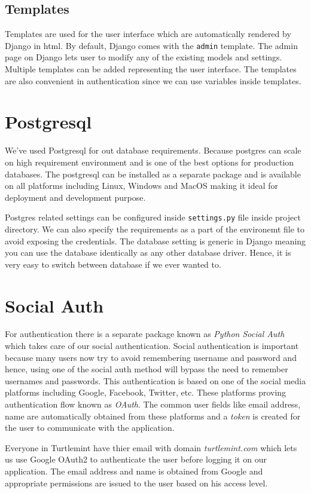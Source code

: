 \subsection{\textbf{Templates}}
Templates are used for the user interface which are automatically rendered by
Django in html. By default, Django comes with the \texttt{admin} template.
The admin page on Django lets user to modify any of the existing models and
settings. Multiple templates can be added representing the user interface.
The templates are also convenient in authentication since we can use variables
inside templates.

\section{Postgresql}
We've used Postgresql for out database requirements. Because postgres can
scale on high requirement environment and is one of the best options for
production databases. The postgresql can be installed as a separate package
and is available on all platforms including Linux, Windows and MacOS making
it ideal for deployment and development purpose.

Postgres related settings can be configured inside \texttt{settings.py} file
inside project directory. We can also specify the requirements as a part of the
environemt file to avoid exposing the credentials. The database setting is
generic in Django meaning you can use the database identically as any other
database driver. Hence, it is very easy to switch between database if we ever
wanted to.

\section{\textbf{Social Auth}}
For authentication there is a separate package known as
\textit{Python Social Auth} which takes care of our social authentication.
Social authentication is important because many users now try to avoid
remembering username and password and hence, using one of the social auth
method will bypass the need to remember usernames and passwords. This
authentication is based on one of the social media platforms including Google,
Facebook, Twitter, etc. These platforms proving authentication flow known as
\textit{OAuth}. The common user fields like email address, name are
automatically obtained from these platforms and a \textit{token} is created
for the user to communicate with the application.

Everyone in Turtlemint have thier email with domain \textit{turtlemint.com}
which lets us use Google OAuth2 to authenticate the user before logging it
on our application. The email address and name is obtained from Google and
appropriate permissions are issued to the user based on his access level.
